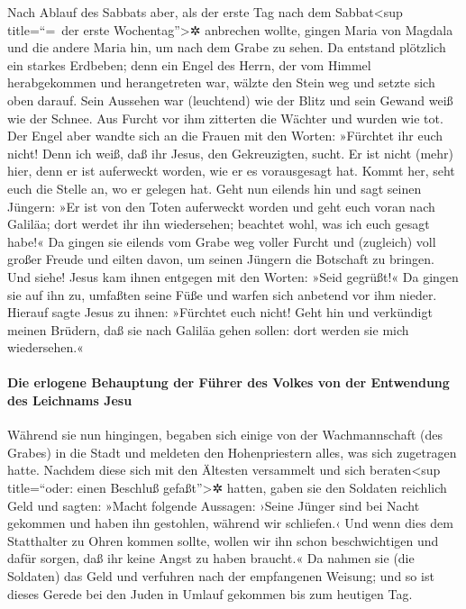  Nach Ablauf des Sabbats aber, als der erste Tag nach dem
Sabbat\textless sup title=``=~der erste Wochentag''\textgreater✲
anbrechen wollte, gingen Maria von Magdala und die andere Maria hin, um
nach dem Grabe zu sehen.  Da entstand plötzlich ein
starkes Erdbeben; denn ein Engel des Herrn, der vom Himmel herabgekommen
und herangetreten war, wälzte den Stein weg und setzte sich oben darauf.
 Sein Aussehen war (leuchtend) wie der Blitz und sein
Gewand weiß wie der Schnee.  Aus Furcht vor ihm zitterten
die Wächter und wurden wie tot.  Der Engel aber wandte
sich an die Frauen mit den Worten: »Fürchtet ihr euch nicht! Denn ich
weiß, daß ihr Jesus, den Gekreuzigten, sucht.  Er ist
nicht (mehr) hier, denn er ist auferweckt worden, wie er es vorausgesagt
hat. Kommt her, seht euch die Stelle an, wo er gelegen hat.
 Geht nun eilends hin und sagt seinen Jüngern: »Er ist von
den Toten auferweckt worden und geht euch voran nach Galiläa; dort
werdet ihr ihn wiedersehen; beachtet wohl, was ich euch gesagt habe!«
 Da gingen sie eilends vom Grabe weg voller Furcht und
(zugleich) voll großer Freude und eilten davon, um seinen Jüngern die
Botschaft zu bringen.  Und siehe! Jesus kam ihnen entgegen
mit den Worten: »Seid gegrüßt!« Da gingen sie auf ihn zu, umfaßten seine
Füße und warfen sich anbetend vor ihm nieder.  Hierauf
sagte Jesus zu ihnen: »Fürchtet euch nicht! Geht hin und verkündigt
meinen Brüdern, daß sie nach Galiläa gehen sollen: dort werden sie mich
wiedersehen.«

\hypertarget{die-erlogene-behauptung-der-fuxfchrer-des-volkes-von-der-entwendung-des-leichnams-jesu}{%
\paragraph{Die erlogene Behauptung der Führer des Volkes von der
Entwendung des Leichnams
Jesu}\label{die-erlogene-behauptung-der-fuxfchrer-des-volkes-von-der-entwendung-des-leichnams-jesu}}

 Während sie nun hingingen, begaben sich einige von der
Wachmannschaft (des Grabes) in die Stadt und meldeten den Hohenpriestern
alles, was sich zugetragen hatte.  Nachdem diese sich mit
den Ältesten versammelt und sich beraten\textless sup title=``oder:
einen Beschluß gefaßt''\textgreater✲ hatten, gaben sie den Soldaten
reichlich Geld  und sagten: »Macht folgende Aussagen:
›Seine Jünger sind bei Nacht gekommen und haben ihn gestohlen, während
wir schliefen.‹  Und wenn dies dem Statthalter zu Ohren
kommen sollte, wollen wir ihn schon beschwichtigen und dafür sorgen, daß
ihr keine Angst zu haben braucht.«  Da nahmen sie (die
Soldaten) das Geld und verfuhren nach der empfangenen Weisung; und so
ist dieses Gerede bei den Juden in Umlauf gekommen bis zum heutigen Tag.

